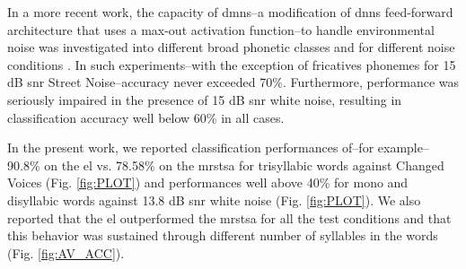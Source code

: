 \documentclass[10pt,letterpaper]{article}
\begin{document}
In a more recent work, the capacity of \glspl{dmn}--a modification of \glspl{dnn} feed-forward architecture that uses a max-out activation function--to handle environmental noise was investigated into different broad phonetic classes and for different noise conditions \cite{silos_2016}.  In such experiments--with the exception of fricatives phonemes for 15 dB \gls{snr} Street Noise--accuracy never exceeded 70\%. Furthermore, performance was seriously impaired in the presence of 15 dB \gls{snr} white noise, resulting in classification accuracy  well below 60\% in all cases.

In the present work, we reported classification performances of--for example--90.8\% on the \gls{el} vs. 78.58\% on the \gls{mrstsa} for trisyllabic words against Changed Voices (Fig. \ref{fig:PLOT}) and performances well above 40\% for mono and disyllabic words against 13.8 dB \gls{snr} white noise (Fig. \ref{fig:PLOT}). We also reported that the \gls{el} outperformed the \gls{mrstsa} for all the test conditions and that this behavior was sustained through different number of syllables in the words (Fig. \ref{fig:AV_ACC}).
\end{document}
